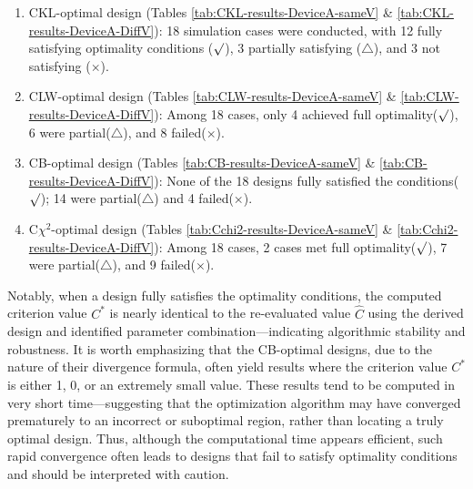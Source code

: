 \begin{enumerate}
\item CKL-optimal design (Tables \ref{tab:CKL-results-DeviceA-sameV} \& \ref{tab:CKL-results-DeviceA-DiffV}): 18 simulation cases were conducted, with 12 fully satisfying optimality conditions ($\surd$), 3 partially satisfying ($\triangle$), and 3 not satisfying ($\times$).

\item CLW-optimal design (Tables \ref{tab:CLW-results-DeviceA-sameV} \& \ref{tab:CLW-results-DeviceA-DiffV}): Among 18 cases, only 4 achieved full optimality($\surd$), 6 were partial($\triangle$), and 8 failed($\times$).

\item CB-optimal design (Tables \ref{tab:CB-results-DeviceA-sameV} \& \ref{tab:CB-results-DeviceA-DiffV}): None of the 18 designs fully satisfied the conditions($\surd$); 14 were partial($\triangle$) and 4 failed($\times$).

\item C$\chi^2$-optimal design (Tables \ref{tab:Cchi2-results-DeviceA-sameV} \& \ref{tab:Cchi2-results-DeviceA-DiffV}): Among 18 cases, 2 cases met full optimality($\surd$), 7 were partial($\triangle$), and 9 failed($\times$).
\end{enumerate}

\hspace*{8mm} Notably, when a design fully satisfies the optimality conditions, the computed criterion value $C^*$ is nearly identical to the re-evaluated value $\hat{C}$ using the derived design and identified parameter combination—indicating algorithmic stability and robustness. It is worth emphasizing that the CB-optimal designs, due to the nature of their divergence formula, often yield results where the criterion value $C^*$ is either 1, 0, or an extremely small value. These results tend to be computed in very short time—suggesting that the optimization algorithm may have converged prematurely to an incorrect or suboptimal region, rather than locating a truly optimal design. Thus, although the computational time appears efficient, such rapid convergence often leads to designs that fail to satisfy optimality conditions and should be interpreted with caution.

